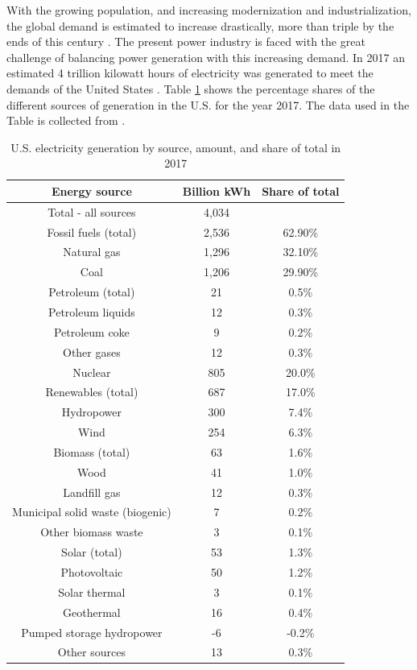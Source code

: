 With the growing population, and increasing modernization and industrialization, the global demand is estimated to increase drastically, more than triple by the ends of this century \cite{INTRO1}. The present power industry is faced with the great challenge of balancing power generation with this increasing demand. In 2017 an estimated 4 trillion kilowatt hours of electricity was generated to meet the demands of the United States \cite{EIA2018}. Table \ref{tab:IN1} shows the percentage shares of the different sources of generation in the U.S. for the year 2017. The data used in the Table is collected from \cite{EIA2018}.

\begin{table}[ht]
\label{tab:IN1}
\caption[U.S. electricity generation by source, amount, and share of total in 2017]{U.S. electricity generation by source, amount, and share of total in 2017 \cite{EIA2018}}
\centering
\begin{tabular}{|c|c|c|}
\hline
Energy source & Billion kWh & Share of total \\ \hline
Total - all sources & 4,034 &  \\ \hline
Fossil fuels (total) & 2,536 & 62.90\% \\ \hline
Natural gas & 1,296 & 32.10\% \\ \hline
Coal & 1,206 & 29.90\% \\ \hline
Petroleum (total) & 21 & 0.5\% \\ \hline
Petroleum liquids & 12 & 0.3\% \\ \hline
Petroleum coke & 9 & 0.2\% \\ \hline
Other gases & 12 & 0.3\% \\ \hline
Nuclear & 805 & 20.0\% \\ \hline
Renewables (total) & 687 & 17.0\% \\ \hline
Hydropower & 300 & 7.4\% \\ \hline
Wind & 254 & 6.3\% \\ \hline
Biomass (total) & 63 & 1.6\% \\ \hline
Wood & 41 & 1.0\% \\ \hline
Landfill gas & 12 & 0.3\% \\ \hline
Municipal solid waste (biogenic) & 7 & 0.2\% \\ \hline
Other biomass waste & 3 & 0.1\% \\ \hline
Solar (total) & 53 & 1.3\% \\ \hline
Photovoltaic & 50 & 1.2\% \\ \hline
Solar thermal & 3 & 0.1\% \\ \hline
Geothermal & 16 & 0.4\% \\ \hline
Pumped storage hydropower & -6 & -0.2\% \\ \hline
Other sources & 13 & 0.3\% \\ \hline
\end{tabular}
\end{table}

